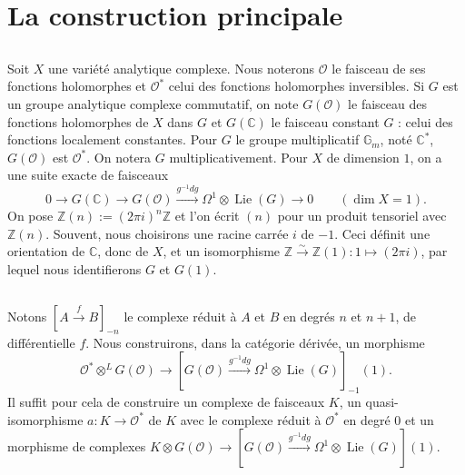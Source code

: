 \documentclass[12pt,a4paper]{article}
\theoremstyle{plain}
\theoremstyle{definition}
\theoremstyle{remark}
\newcommand{\cO}{\mathcal{O}}
\newcommand{\Z}{\mathbb{Z}}
\newcommand{\C}{\mathbb{C}}
\newcommand{\Gm}{\mathbb{G}_m}
\providecommand{\Gm}{\mathbb{G}_{\mathrm m}}
\providecommand{\cO}{\mathcal{O}}
\begin{document}
\section{La construction principale}

\subsection{}

Soit $X$ une variété analytique complexe. Nous noterons $\cO$ le faisceau de ses
fonctions holomorphes et $\cO^*$ celui des fonctions holomorphes inversibles. Si $G$ est un
groupe analytique complexe commutatif, on note $G(\cO)$ le faisceau des fonctions holomorphes de $X$ dans $G$ et $G(\C)$ le faisceau constant $G$ : celui des fonctions localement
constantes. Pour $G$ le groupe multiplicatif $\Gm$, noté $\C^*$, $G(\cO)$ est $\cO^*$. On notera $G$
multiplicativement. Pour $X$ de dimension $1$, on a une suite exacte de faisceaux
\begin{equation}\label{eq:2.1.1}
0 \to G(\C) \to G(\cO) \xrightarrow{g^{-1}dg} \Omega^1 \otimes \operatorname{Lie}(G) \to 0
\qquad (\dim X = 1).
\end{equation}
On pose $\Z(n) := (2\pi i)^n\Z$ et l'on écrit $(n)$ pour un produit tensoriel avec $\Z(n)$. Souvent, nous choisirons une racine carrée $i$ de $-1$. Ceci définit une orientation de $\C$, donc
de $X$, et un isomorphisme $\Z \xrightarrow{\sim} \Z(1) : 1 \mapsto (2\pi i)$, par lequel nous identifierons $G$ et $G(1)$.

\subsection{}

Notons $[A \xrightarrow{f} B]_{-n}$ le complexe réduit à $A$ et $B$ en degrés $n$ et $n+1$,
de différentielle $f$. Nous construirons, dans la catégorie dérivée, un morphisme
\begin{equation}\label{eq:2.2.1}
\cO^* \otimes^L G(\cO) \to [G(\cO) \xrightarrow{g^{-1}dg} \Omega^1 \otimes \operatorname{Lie}(G)]_{-1}(1).
\end{equation}
Il suffit pour cela de construire un complexe de faisceaux $K$, un quasi-isomorphisme
$a : K \to \cO^*$ de $K$ avec le complexe réduit à $\cO^*$ en degré $0$ et un morphisme de complexes
$K \otimes G(\cO) \to [G(\cO) \xrightarrow{g^{-1}dg} \Omega^1 \otimes \operatorname{Lie}(G)](1)$.
\end{document}
